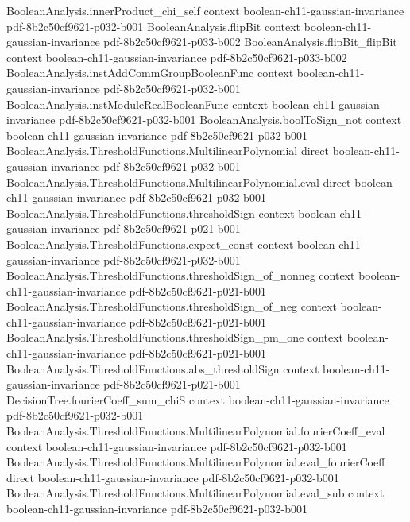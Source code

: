 \begin{lemma}
\proofstep
  {BooleanAnalysis.innerProduct_chi_self}
  {context}
  {boolean-ch11-gaussian-invariance}
  {pdf-8b2c50cf9621-p032-b001}
\proofstep
  {BooleanAnalysis.flipBit}
  {context}
  {boolean-ch11-gaussian-invariance}
  {pdf-8b2c50cf9621-p033-b002}
\proofstep
  {BooleanAnalysis.flipBit_flipBit}
  {context}
  {boolean-ch11-gaussian-invariance}
  {pdf-8b2c50cf9621-p033-b002}
\proofstep
  {BooleanAnalysis.instAddCommGroupBooleanFunc}
  {context}
  {boolean-ch11-gaussian-invariance}
  {pdf-8b2c50cf9621-p032-b001}
\proofstep
  {BooleanAnalysis.instModuleRealBooleanFunc}
  {context}
  {boolean-ch11-gaussian-invariance}
  {pdf-8b2c50cf9621-p032-b001}
\proofstep
  {BooleanAnalysis.boolToSign_not}
  {context}
  {boolean-ch11-gaussian-invariance}
  {pdf-8b2c50cf9621-p032-b001}
\proofstep
  {BooleanAnalysis.ThresholdFunctions.MultilinearPolynomial}
  {direct}
  {boolean-ch11-gaussian-invariance}
  {pdf-8b2c50cf9621-p032-b001}
\proofstep
  {BooleanAnalysis.ThresholdFunctions.MultilinearPolynomial.eval}
  {direct}
  {boolean-ch11-gaussian-invariance}
  {pdf-8b2c50cf9621-p032-b001}
\proofstep
  {BooleanAnalysis.ThresholdFunctions.thresholdSign}
  {context}
  {boolean-ch11-gaussian-invariance}
  {pdf-8b2c50cf9621-p021-b001}
\proofstep
  {BooleanAnalysis.ThresholdFunctions.expect_const}
  {context}
  {boolean-ch11-gaussian-invariance}
  {pdf-8b2c50cf9621-p032-b001}
\proofstep
  {BooleanAnalysis.ThresholdFunctions.thresholdSign_of_nonneg}
  {context}
  {boolean-ch11-gaussian-invariance}
  {pdf-8b2c50cf9621-p021-b001}
\proofstep
  {BooleanAnalysis.ThresholdFunctions.thresholdSign_of_neg}
  {context}
  {boolean-ch11-gaussian-invariance}
  {pdf-8b2c50cf9621-p021-b001}
\proofstep
  {BooleanAnalysis.ThresholdFunctions.thresholdSign_pm_one}
  {context}
  {boolean-ch11-gaussian-invariance}
  {pdf-8b2c50cf9621-p021-b001}
\proofstep
  {BooleanAnalysis.ThresholdFunctions.abs_thresholdSign}
  {context}
  {boolean-ch11-gaussian-invariance}
  {pdf-8b2c50cf9621-p021-b001}
\proofstep
  {DecisionTree.fourierCoeff_sum_chiS}
  {context}
  {boolean-ch11-gaussian-invariance}
  {pdf-8b2c50cf9621-p032-b001}
\proofstep
  {BooleanAnalysis.ThresholdFunctions.MultilinearPolynomial.fourierCoeff_eval}
  {context}
  {boolean-ch11-gaussian-invariance}
  {pdf-8b2c50cf9621-p032-b001}
\proofstep
  {BooleanAnalysis.ThresholdFunctions.MultilinearPolynomial.eval_fourierCoeff}
  {direct}
  {boolean-ch11-gaussian-invariance}
  {pdf-8b2c50cf9621-p032-b001}
\proofstep
  {BooleanAnalysis.ThresholdFunctions.MultilinearPolynomial.eval_sub}
  {context}
  {boolean-ch11-gaussian-invariance}
  {pdf-8b2c50cf9621-p032-b001}

\end{lemma}
